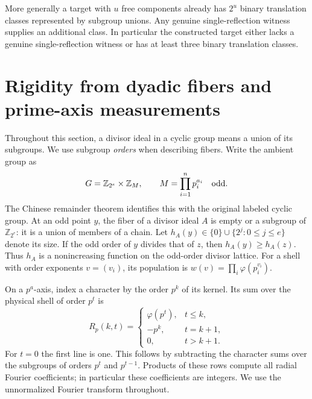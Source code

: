 \documentclass[11pt]{article}
\numberwithin{equation}{section}
\theoremstyle{definition}
\theoremstyle{remark}
\begin{document}
More generally a target with $u$ free components already has $2^u$ binary translation classes represented by subgroup unions. Any genuine single-reflection witness supplies an additional class. In particular the constructed target either lacks a genuine single-reflection witness or has at least three binary translation classes.




\section{Rigidity from dyadic fibers and prime-axis measurements}
\label{sec:primary-rigidity}

Throughout this section, a divisor ideal in a cyclic group means a union
of its subgroups. We use subgroup \emph{orders} when describing fibers.
Write the ambient group as
\[
G=\mathbb Z_{2^e}\times \mathbb Z_M,
\qquad M=\prod_{i=1}^n p_i^{a_i}\quad\hbox{odd}.
\]
The Chinese remainder theorem identifies this with the original labeled
cyclic group. At an odd point \(y\), the fiber of a divisor ideal \(A\)
is empty or a subgroup of \(\mathbb Z_{2^e}\): it is a union of members
of a chain. Let \(h_A(y)\in\{0\}\cup\{2^j:0\le j\le e\}\)
denote its size. If the odd
order of \(y\) divides that of \(z\), then \(h_A(y)\ge h_A(z)\).
Thus \(h_A\) is a nonincreasing function on the odd-order divisor lattice.
For a shell with order exponents \(v=(v_i)\), its population is
\(w(v)=\prod_i\varphi(p_i^{v_i})\).

On a \(p^a\)-axis, index a character by the order \(p^k\) of its
kernel. Its sum over the physical shell of order \(p^t\) is
\begin{equation}
R_p(k,t)=
\begin{cases}
\varphi(p^t),&t\le k,\\
-p^k,&t=k+1,\\
0,&t>k+1.
\end{cases}
\label{eq:primary-shell-row}
\end{equation}
For \(t=0\) the first line is one. This follows by subtracting the
character sums over the subgroups of orders \(p^t\) and \(p^{t-1}\).
Products of these rows compute all radial Fourier coefficients; in
particular these coefficients are integers. We use the unnormalized
Fourier transform throughout.
\end{document}

